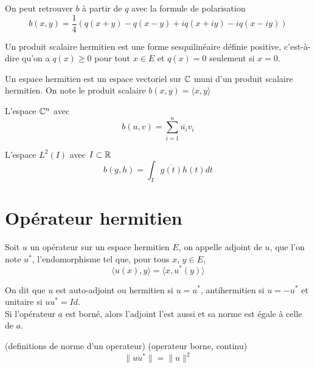 On peut retrouver $b$ à partir de $q$ avec la formule de polarisation
\begin{equation}
b(x,y)=\frac{1}{4}(q(x+y)-q(x-y)+iq(x+iy)-iq(x-iy))
\end{equation}
\begin{definition}
	Un produit scalaire hermitien est une forme sesquilinéaire définie positive, c’est-à-dire qu’on a $q(x) \geq 0$ pour tout $x \in E$ et $q(x)=0$ seulement si $x=0$.
\end{definition}
\begin{definition}
	Un espace hermitien est un espace vectoriel sur $\mathbb C$ muni d'un produit scalaire hermitien. On note le produit scalaire $b(x,y)=\langle x, y \rangle$
\end{definition}
\begin{ex}
	L'espace $\mathbb C^n$ avec
	\begin{equation*}
	b(u,v)=\sum_{i=1}^{n} \overline{u_i}v_i
	\end{equation*}
\end{ex}
\begin{ex}
	L'espace $L^2(I)$ avec $I \subset \mathbb R$
	\begin{equation*}
	b(g,h)=\int_{I} \overline{g(t)}h(t)dt
	\end{equation*}
\end{ex}

\section{Opérateur hermitien}
\begin{definition}
	Soit $u$ un opérateur sur un espace hermitien $E$, on appelle adjoint de $u$, que l'on note $u^*$, l'endomorphisme tel que, pour tous $x$, $y \in E$,
	\begin{equation*}
	\langle u(x), y \rangle = \langle x, u^*(y)\rangle
	\end{equation*}
	
	On dit que $u$ est auto-adjoint ou hermitien si $u=u^*$, antihermitien si $u=-u^*$ et unitaire si $uu^*=Id$.\\
	Si l'opérateur $a$ est borné, alors l'adjoint l'est aussi et sa norme est égale à celle de $a$.
\end{definition}
(definitions de norme d'un operateur)
(operateur borne, continu)
\begin{equation*}
\lVert uu^* \rVert=\lVert u\rVert^2
\end{equation*}